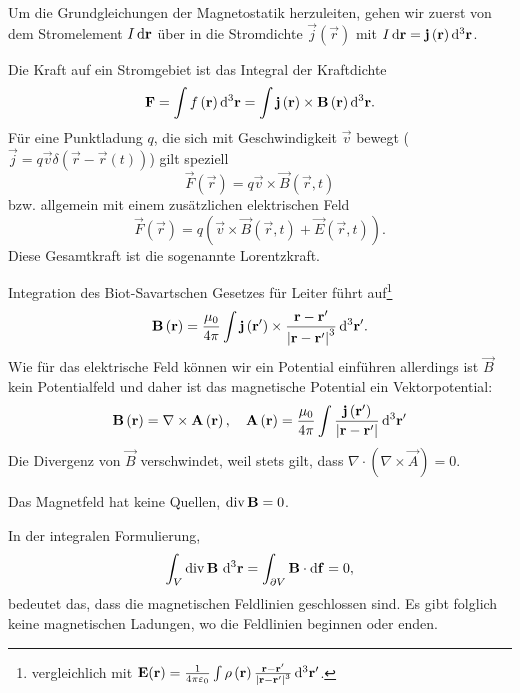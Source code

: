 Um die Grundgleichungen der Magnetostatik herzuleiten, gehen wir zuerst von dem Stromelement $I\mathop{}\!\mathrm{d} \mathbf{r}$ über in die Stromdichte $\vec {j}\left(\vec {r}\right)$ mit $I\mathop{}\!\mathrm{d} \mathbf{r}=\mathbf{j}\left(\mathbf{r}\right)\mathop{}\!\mathrm{d}^3 \mathbf{r}$.

Die Kraft auf ein Stromgebiet ist das Integral der Kraftdichte
\begin{equation*}
	\mathbf{F}=\int f\left(\mathbf{r}\right)\mathop{}\!\mathrm{d} ^{3}\mathbf{r}=\int \mathbf{j}\left(\mathbf{r}\right)\times \mathbf{B}\left(\mathbf{r}\right)\mathop{}\!\mathrm{d} ^{3}\mathbf{r}.
\end{equation*}
Für eine Punktladung $q$, die sich mit Geschwindigkeit $\vec {v}$ bewegt ($\vec {j}=q\vec {v}\delta \left(\vec {r}-\vec {r}\left(t\right)\right)$) gilt speziell
\begin{equation*}
	\vec F\left(\vec {r}\right)=q\vec {v}\times \vec {B}\left(\vec {r},t\right)
\end{equation*}
bzw. allgemein mit einem zusätzlichen elektrischen Feld
\begin{equation*}
	\vec F\left(\vec {r}\right)=q\left(\vec {v}\times \vec {B}\left(\vec {r},t\right)+\vec {E}\left(\vec {r},t\right)\right).
\end{equation*}
Diese Gesamtkraft ist die sogenannte Lorentzkraft.

Integration des Biot-Savartschen Gesetzes für Leiter führt auf\footnote{vergleichlich mit $\mathbf{E}(\mathbf{r})=\frac{1}{4\pi \varepsilon _{0}}\int \rho \left(\mathbf{r}\right)\frac{\mathbf{r}-\mathbf{r}'}{\left| \mathbf{r}-\mathbf{r}'\right| ^{3}}\mathop{}\!\mathrm{d} ^{3}\mathbf{r}'$.}
\begin{equation*}
	\mathbf{B}\left(\mathbf{r}\right)=\frac{\mu _{0}}{4\pi }\int \mathbf{j}\left(\mathbf{r'}\right)\times \frac{\mathbf{r}-\mathbf{r}'}{\left| \mathbf{r}-\mathbf{r}'\right| ^{3}}\mathop{}\!\mathrm{d} ^{3}\mathbf{r}'.
\end{equation*}
Wie für das elektrische Feld können wir ein Potential einführen \textendash{} allerdings ist $\vec {B}$ kein Potentialfeld und daher ist das magnetische Potential ein Vektorpotential:
\begin{equation*}
	\mathbf{B}\left(\mathbf{r}\right)=\nabla \times \mathbf{A}\left(\mathbf{r}\right), \quad\mathbf{A}\left(\mathbf{r}\right)=\frac{\mu _{0}}{4\pi }\int \frac{\mathbf{j}\left(\mathbf{r}'\right)}{\left| \mathbf{r}-\mathbf{r}'\right| }\mathop{}\!\mathrm{d} ^{3}\mathbf{r}'
\end{equation*}
Die Divergenz von $\vec {B}$ verschwindet, weil stets gilt, dass $\nabla\cdot(\nabla\times \vec A) = 0$.
\begin{formal}
	Das Magnetfeld hat keine Quellen, $\operatorname{div} \mathbf{B}=0$.
\end{formal}
In der integralen Formulierung,
\begin{equation*}
	\int _{V}\operatorname{div} \mathbf{B}\,\mathop{}\!\mathrm{d} ^{3}\mathbf{r}=\int _{\partial V}\mathbf{B}\cdot \mathop{}\!\mathrm{d} \mathbf{f}=0,
\end{equation*}
bedeutet das, dass die magnetischen Feldlinien geschlossen sind. Es gibt folglich keine magnetischen Ladungen, wo die Feldlinien beginnen oder enden.

